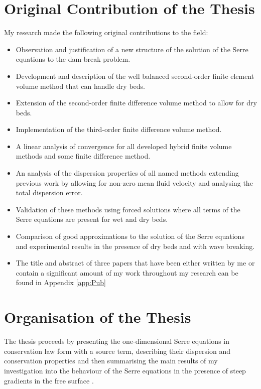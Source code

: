 \section{Original Contribution of the Thesis}

My research made the following original contributions to the field:
\begin{itemize}
	\item Observation and justification of a new structure of the solution of the Serre equations to the dam-break problem.
	\item Development and description of the well balanced second-order finite element volume method that can handle dry beds.
	\item Extension of the second-order finite difference volume method to allow for dry beds.
	\item Implementation of the third-order finite difference volume method.
	\item A linear analysis of convergence for all developed hybrid finite volume methods and some finite difference method.
	\item An analysis of the dispersion properties of all named methods extending previous work by allowing for non-zero mean fluid velocity and analysing the total dispersion error.
	\item Validation of these methods using forced solutions where all terms of the Serre equations are present for wet and dry beds.
	\item Comparison of good approximations to the solution of the Serre equations and experimental results in the presence of dry beds and with wave breaking. 
	\item The title and abstract of three papers that have been either written by me or contain a significant amount of my work throughout my research can be found in Appendix \ref{app:Pub}
\end{itemize}



\section{Organisation of the Thesis}
The thesis proceeds by presenting the one-dimensional Serre equations in conservation law form with a source term, describing their dispersion and conservation properties and then summarising the main results of my investigation into the behaviour of the Serre equations in the presence of steep gradients in the free surface \cite{Pitt-2018-61}.

